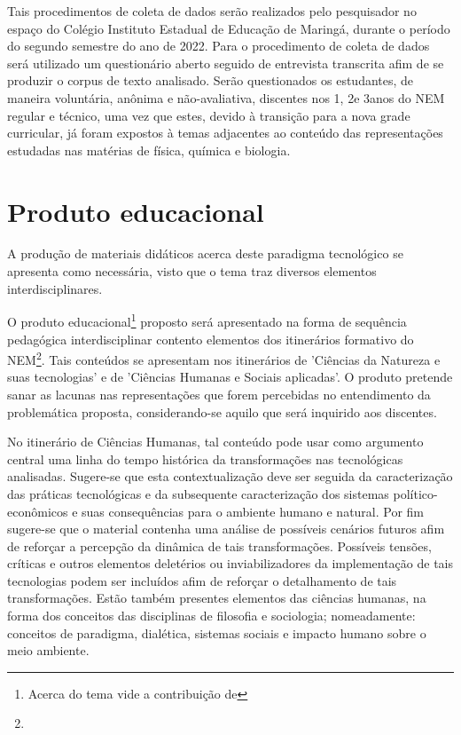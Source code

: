 \documentclass[
  12pt,       %
  openright,      %
  twoside,      %
  a4paper,      %
  english,      %
  french,       %
  spanish,      %
  brazil        %
  ]{abntex2}
\begin{document}
Tais procedimentos de coleta de dados serão realizados pelo pesquisador no espaço do Colégio Instituto Estadual de Educação de Maringá, durante o período do segundo semestre do ano de 2022. Para o procedimento de coleta de dados será utilizado um questionário aberto seguido de entrevista transcrita afim de se produzir o corpus de texto analisado. Serão questionados os estudantes, de maneira voluntária, anônima e não-avaliativa, discentes nos 1\textordmasculine, 2\textordmasculine e 3\textordmasculine anos do NEM regular e técnico, uma vez que estes, devido à transição para a nova grade curricular, já foram expostos à temas adjacentes ao conteúdo das representações estudadas nas matérias de física, química e biologia. 



\chapter{Produto educacional}

A produção de materiais didáticos acerca deste paradigma tecnológico se apresenta como necessária, visto que o tema traz diversos elementos interdisciplinares.

O produto educacional\footnote{Acerca do tema vide a contribuição de } proposto será apresentado na forma de sequência pedagógica interdisciplinar contento elementos dos itinerários formativo do NEM\footnote{}. Tais conteúdos se apresentam nos itinerários de 'Ciências da Natureza e suas tecnologias' e de 'Ciências Humanas e Sociais aplicadas'. O produto pretende sanar as lacunas nas representações que forem percebidas no entendimento da problemática proposta, considerando-se aquilo que será inquirido aos discentes.

No itinerário de Ciências Humanas, tal conteúdo pode usar como argumento central uma linha do tempo histórica da transformações nas tecnológicas analisadas. Sugere-se que esta contextualização deve ser seguida da caracterização das práticas tecnológicas e da subsequente caracterização dos sistemas político-econômicos e suas consequências para o ambiente humano e natural. Por fim sugere-se que o material contenha uma análise de possíveis cenários futuros afim de reforçar a percepção da dinâmica de tais transformações. Possíveis tensões, críticas e outros elementos deletérios ou inviabilizadores da implementação de tais tecnologias podem ser incluídos afim de reforçar o detalhamento de tais transformações. Estão também presentes elementos das ciências humanas, na forma dos conceitos das disciplinas de filosofia e sociologia; nomeadamente: conceitos de paradigma, dialética, sistemas sociais e impacto humano sobre o meio ambiente.
\end{document}
